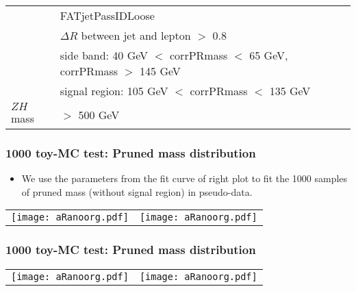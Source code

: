 \documentclass{beamer}
\begin{document}
\begin{frame}
\begin{center}
\begin{tiny}
\begin{tabular}[t]{ | l | l | }
        & FATjetPassIDLoose                              \\
        & $\Delta R$ between jet and lepton $>$ 0.8      \\
        & side band: 40 GeV $<$ corrPRmass $<$ 65 GeV, corrPRmass $>$ 145 GeV \\
        & signal region: 105 GeV $<$ corrPRmass $<$ 135 GeV \\
        \hline
        $ZH$ mass                 
        & $>$ 500 GeV                                    \\
        \hline      
      \end{tabular}
      \label{tab:select}
    \end{tiny}
  \end{center}
\end{frame}

\begin{frame}
  \frametitle{1000 toy-MC test: Pruned mass distribution}
  \begin{center}
    \begin{footnotesize}
      \begin{itemize}
      \item We use the parameters from the fit curve of right plot to fit the 1000 samples of pruned mass (without signal region) in pseudo-data.
      \end{itemize}
    \end{footnotesize}
    \begin{tabular}{ll}
      \texttt{[image: aRanoorg.pdf]} &
      \texttt{[image: aRanoorg.pdf]} \\
    \end{tabular}
  \end{center}
\end{frame}

\begin{frame}
  \frametitle{1000 toy-MC test: Pruned mass distribution}
  \begin{center}
    \begin{tabular}{ll}
      \texttt{[image: aRanoorg.pdf]} &
      \texttt{[image: aRanoorg.pdf]} \\
    \end{tabular}
  \end{center}
\end{frame}
\end{document}
